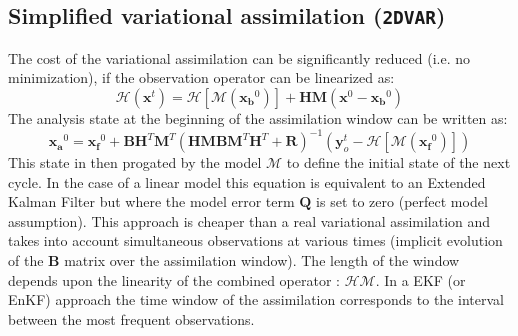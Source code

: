 \documentclass[12pt]{article}
\begin{document}
\subsection{Simplified variational assimilation ({\tt 2DVAR})}
The cost of the variational assimilation can be significantly reduced
(i.e. no minimization), if
the observation operator can be linearized as:
\[
\mathcal{H} (\mathbf{x}^t) = \mathcal{H} \left[
\mathcal{M}(\mathbf{x_b}^0) \right] +
\mathbf{HM} ( \mathbf{x}^0 - \mathbf{x_b}^0)
\]
The analysis state at the beginning of the assimilation window can be written as:
\[
\mathbf{x_a}^0 = \mathbf{x_f}^0 + \mathbf{B}\mathbf{H}^T
\mathbf{M}^T(
 \mathbf{HMBM}^T\mathbf{H}^T +  \mathbf{R})^{-1} (\mathbf{y}^t_o -
 \mathcal{H}\left[\mathcal{M}(\mathbf{x_f}^0)\right])
\]
This state in then progated by the model $\mathcal{M}$
to define the initial state of the next cycle.  
In the case of a linear model this equation is
equivalent to an Extended Kalman Filter but 
where the model error term $\mathbf{Q}$ is set to zero
(perfect model assumption).
This approach is cheaper than a real variational assimilation
and takes into account simultaneous observations at various times
(implicit evolution of the $\mathbf{B}$ matrix over the assimilation
window).  The length of the window depends upon the linearity
of the combined operator : $\mathcal{H}\mathcal{M}$. 
In a EKF (or EnKF) approach the time window of the assimilation
corresponds to the interval between the most
frequent observations.
\end{document}
